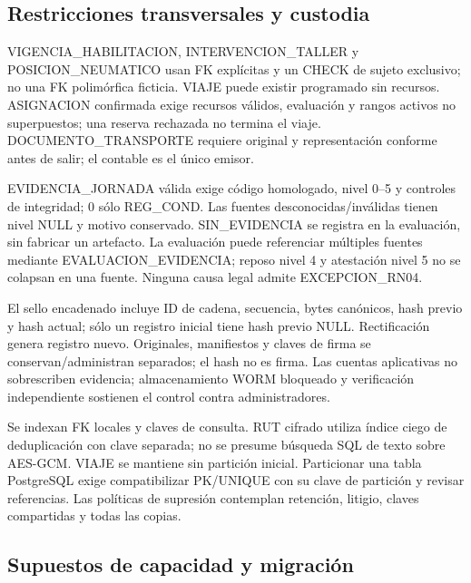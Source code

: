 \subsection*{Restricciones transversales y custodia}\label{sec:05-anexo-restricciones-transversales-y-custodia}

VIGENCIA\_\allowbreak{}HABILITACION, INTERVENCION\_\allowbreak{}TALLER y POSICION\_\allowbreak{}NEUMATICO usan FK explícitas y un CHECK de sujeto exclusivo; no una FK polimórfica ficticia. VIAJE puede existir programado sin recursos. ASIGNACION confirmada exige recursos válidos, evaluación y rangos activos no superpuestos; una reserva rechazada no termina el viaje. DOCUMENTO\_\allowbreak{}TRANSPORTE requiere original y representación conforme antes de salir; el contable es el único emisor.

EVIDENCIA\_\allowbreak{}JORNADA válida exige código homologado, nivel 0–5 y controles de integridad; 0 sólo REG\_\allowbreak{}COND. Las fuentes desconocidas/inválidas tienen nivel NULL y motivo conservado. SIN\_\allowbreak{}EVIDENCIA se registra en la evaluación, sin fabricar un artefacto. La evaluación puede referenciar múltiples fuentes mediante EVALUACION\_\allowbreak{}EVIDENCIA; reposo nivel 4 y atestación nivel 5 no se colapsan en una fuente. Ninguna causa legal admite EXCEPCION\_\allowbreak{}RN04.

El sello encadenado incluye ID de cadena, secuencia, bytes canónicos, hash previo y hash actual; sólo un registro inicial tiene hash previo NULL. Rectificación genera registro nuevo. Originales, manifiestos y claves de firma se conservan/administran separados; el hash no es firma. Las cuentas aplicativas no sobrescriben evidencia; almacenamiento WORM bloqueado y verificación independiente sostienen el control contra administradores.

Se indexan FK locales y claves de consulta. RUT cifrado utiliza índice ciego de deduplicación con clave separada; no se presume búsqueda SQL de texto sobre AES-GCM. VIAJE se mantiene sin partición inicial. Particionar una tabla PostgreSQL exige compatibilizar PK/UNIQUE con su clave de partición y revisar referencias. Las políticas de supresión contemplan retención, litigio, claves compartidas y todas las copias.

\subsection*{Supuestos de capacidad y migración}\label{sec:05-anexo-supuestos-de-capacidad-y-migracion}

